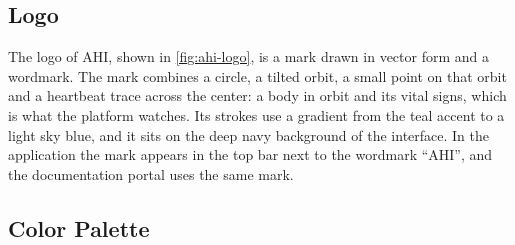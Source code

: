 \newcommand{\swatch}[1]{{\setlength{\fboxsep}{0pt}\setlength{\fboxrule}{0.3pt}\fcolorbox{black!35}{#1}{\rule{0pt}{0.85em}\rule{2.2em}{0pt}}}}
\newcommand{\statuspill}[2]{\tikz[baseline=-0.6ex]\node[fill=#1,rounded corners=5pt,inner xsep=7pt,inner ysep=3.5pt,text=ahiSpace900,font=\footnotesize\bfseries]{#2};}

\subsection{Logo}
\label{subsec:logo}

The logo of AHI, shown in \ref{fig:ahi-logo}, is a mark drawn in vector form and a wordmark. The mark combines a circle, a tilted orbit, a small point on that orbit and a heartbeat trace across the center: a body in orbit and its vital signs, which is what the platform watches. Its strokes use a gradient from the teal accent to a light sky blue, and it sits on the deep navy background of the interface. In the application the mark appears in the top bar next to the wordmark ``AHI'', and the documentation portal uses the same mark.


\subsection{Color Palette}
\label{subsec:color-palette}

